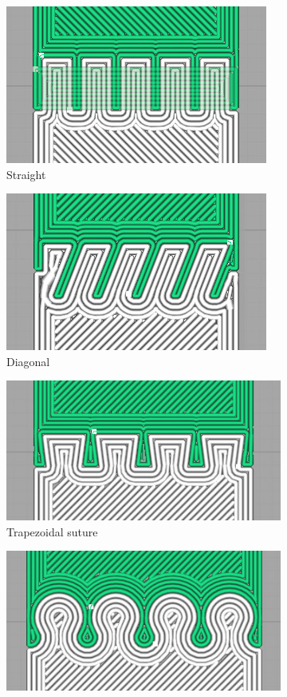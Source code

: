 \begin{figure}
	\setlength{\figheight}{.13\columnwidth}
	\centering
	\begin{subfigure}[B]{.2\columnwidth}
		\centering
		\includegraphics[height=\figheight]{sources/testing/straight_gcode.jpg}
		\caption{Straight}
		\label{fig:gcode_straight}
	\end{subfigure}
	\begin{subfigure}[B]{.2\columnwidth}
		\centering
		\includegraphics[height=\figheight]{sources/testing/diagonal_gcode.jpg}
		\caption{Diagonal}
		\label{fig:gcode_diagonal}
	\end{subfigure}
	\begin{subfigure}[B]{.24\columnwidth}
		\centering
		\includegraphics[height=\figheight]{sources/testing/suture_gcode.jpg}
		\caption{Trapezoidal suture}
		\label{fig:gcode_suture}
	\end{subfigure}
	\begin{subfigure}[B]{.24\columnwidth}
		\centering
		\includegraphics[height=\figheight]{sources/testing/jigsaw_gcode.jpg}

\end{subfigure}
\end{figure}

